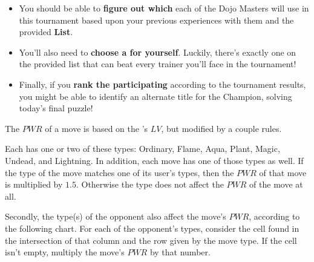 \begin{itemize}
  \item You should be able to \textbf{figure out which \mappMobimon{}} each of
        the Dojo Masters will use in this tournament
        based upon your previous experiences with them and the provided
        \textbf{\mappMobimon{} List}.
  \item You'll also need to \textbf{choose a \mappMobimon{} for yourself}.
        Luckily, there's exactly one \mappMobimon{} on the provided list that
        can beat every trainer you'll face in the tournament!
  \item Finally, if you \textbf{rank the participating \mappMobimon{}} according
        to the tournament results, you might be able to identify an alternate
        title for the \mappMobimon{} Champion, solving today's final
        puzzle!
\end{itemize}



The \(PWR\) of a \mappMobimon{} move is based on the
\mappMobimon{}'s \(LV\), but modified by a couple rules.

Each \mappMobimon{} has one or two of these types: Ordinary, Flame, Aqua, Plant,
Magic, Undead, and Lightning. In addition, each \mappMobimon{} move has one
of those types as well. If the type of the move matches one of its user's
types, then the \(PWR\) of that move is multiplied by \(1.5\). Otherwise
the \mappMobimon{} type does not affect the \(PWR\) of the move at all.

Secondly, the type(s) of the opponent \mappMobimon{} also affect the move's
\(PWR\), according to the following chart.
For each of the opponent's types, consider the cell found in the
intersection of that column and the row given by the move type. If the cell
isn't empty, multiply the move's \(PWR\) by that number.

